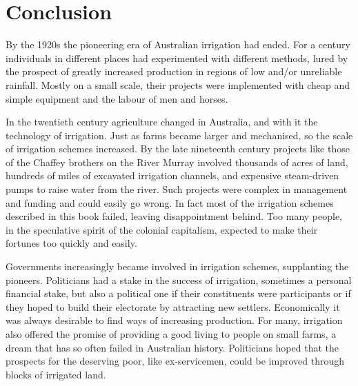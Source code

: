 
\setcounter{endnote}{0}

\chapter{Conclusion}
\label{ch:reflect}


By the 1920s the pioneering era of Australian irrigation had
ended. For a century individuals in different places had experimented
with different methods, lured by the prospect of greatly increased
production in regions of low and/or unreliable rainfall. Mostly on a
small scale, their projects were implemented with cheap and simple
equipment and the labour of men and horses.

In the twentieth century agriculture changed in Australia, and with it
the technology of irrigation. Just as farms became larger and
mechanised, so the scale of irrigation schemes increased. By the late
nineteenth century projects like those of the Chaffey brothers
 on the River Murray  involved
thousands of acres of land, hundreds of miles of excavated irrigation
channels, and expensive steam-driven pumps to raise water from the
river. Such projects were complex in management and funding and could
easily go wrong. In fact most of the irrigation sch\-emes described in
this book failed, leaving disappointment behind. Too many people, in
the speculative spirit of the colonial capitalism, expected to make
their fortunes too quickly and easily.

Governments increasingly became involved in irrigation schemes,
supplanting the pioneers. Politicians had a stake in the success of
irrigation, sometimes a personal financial stake, but also a political
one if their constituents were participants or if they hoped to build
their electorate by attracting new settlers. Economically it was
always desirable to find ways of increasing production. For many,
irrigation also offered the promise of providing a good living to
people on small farms, a dream that has so often failed in Australian
history. Politicians hoped that the prospects for the deserving poor,
like ex-servicemen, could be improved through blocks of irrigated
land.

